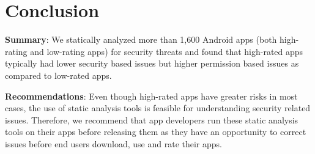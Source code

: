 \section{Conclusion}
\label{sec:conclusion}

\noindent \textbf{Summary}: We statically analyzed more than 1,600 Android apps (both high-rating and low-rating apps) for security threats and found that high-rated apps typically had lower security based issues but higher permission based issues as compared to low-rated apps. 

\noindent \textbf{Recommendations}: Even though high-rated apps have greater risks in most cases, the use of static analysis tools is feasible for understanding security related issues. Therefore, we recommend that app developers run these static analysis tools on their apps before releasing them as they have an opportunity to correct issues before end users download, use and rate their apps. 